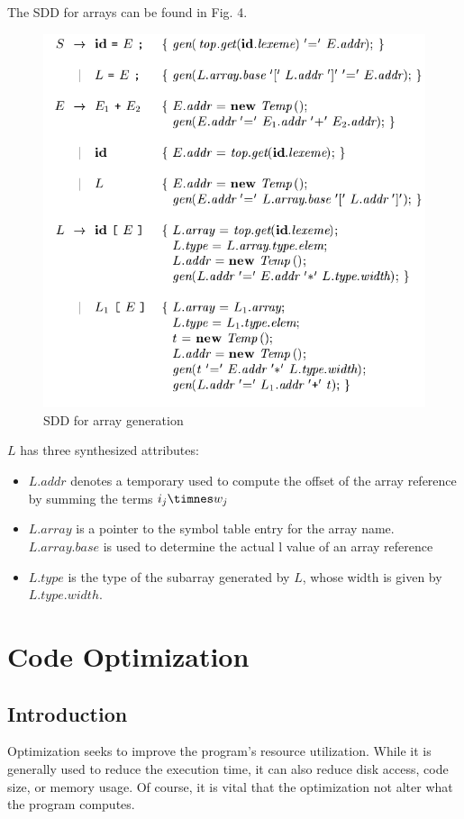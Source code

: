 \documentclass[12pt,letterpaper]{book}
\theoremstyle{definition}
\begin{document}
The SDD for arrays can be found in Fig. 4.

\begin{figure}[htpb]
  \centering
  \includegraphics[width=0.8\linewidth]{./assets/array_sdd.png}
  \caption{SDD for array generation}%
  \label{fig:}
\end{figure}

$L$ has three synthesized attributes:
\begin{itemize}
  \item $L.addr$ denotes a temporary used to compute the offset of the array reference by summing the terms $i_j \timnes w_j$
  \item $L.array$ is a pointer to the symbol table entry for the array name. $L.array.base$ is used to determine the actual l value of an array reference
  \item $L.type$ is the type of the subarray generated by $L$, whose width is given by $L.type.width$.
\end{itemize}

\chapter{Code Optimization}

\section{Introduction}

Optimization seeks to improve the program's resource utilization. While it is generally used to reduce the execution time, it can also reduce disk access, code size, or memory usage. Of course, it is vital that the optimization not alter what the program computes.
\end{document}
